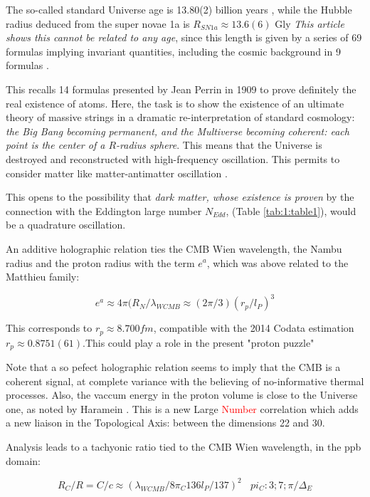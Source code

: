 \documentclass[a4paper,9pt]{article}
\begin{document}
    
    The so-called standard Universe age is 13.80(2) billion years \cite{Tanabashi}, while the Hubble radius deduced from the super novae 1a is $R_{SN1a} \approx 13.6(6)$ Gly \cite{Friedman}\textit{This article shows this cannot be related to any age}, since this length is given by a series of 69 formulas implying invariant quantities, including the cosmic background in 9 formulas . 
    
    
    This recalls 14 formulas presented by Jean Perrin in 1909 to prove definitely the real existence of atoms. Here, the task is to show the existence of an ultimate theory of massive strings in a dramatic re-interpretation of standard cosmology:\textit{ the Big Bang becoming permanent, and the Multiverse becoming coherent: each point is the center of a $R$-radius sphere}. This means that the Universe is destroyed and reconstructed with high-frequency oscillation. This permits to consider matter like matter-antimatter oscillation \cite{Sanchez2}. 
    
    This opens to the possibility that \textit {dark matter, whose existence is proven} by the connection with the Eddington large number $N_{Edd}$, (Table \ref{tab:1:table1}), would be a quadrature oscillation.

An additive holographic relation ties the CMB Wien wavelength, the Nambu radius and the proton radius with the term $e^a$, which was above related to the Matthieu family:

\begin{equation}
       e^a \approx 4\pi (R_N/\lambda_{WCMB} \approx (2\pi/3) (r_p/l_P)^3
    \end{equation}

This corresponds to $r_p \approx 8.700 fm$, compatible with the 2014 Codata estimation  $r_p \approx 0.8751(61)$.This could play a role in the present "proton puzzle" \cite{Val}  


Note that a so pefect holographic relation seems to imply that the CMB is a coherent signal, at complete variance with the believing of no-informative thermal processes. Also, the vaccum energy in the proton volume is close to the Universe one, as noted by Haramein \cite{Haramein}. This is a new Large \textcolor{red}{Number} correlation which adds a new liaison in the Topological Axis: between the dimensions 22 and 30.


Analysis leads to a tachyonic ratio tied to the CMB Wien wavelength, in the ppb domain: 

\begin{equation}
     R_C /R = C/c \approx (\lambda_{WCMB}/8\pi_C 136 l_P/137)^2    ~~~~ pi_C : 3; 7; \pi/\Delta_E
    \end{equation}
\end{document}
